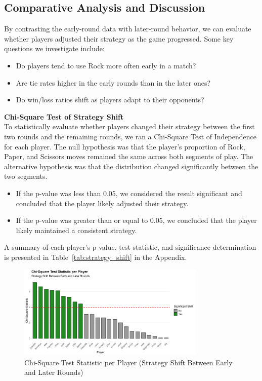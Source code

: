 \documentclass[12pt]{article}
\begin{document}
\subsection*{Comparative Analysis and Discussion}
By contrasting the early-round data with later-round behavior, we can evaluate whether players adjusted their strategy as the game progressed. Some key questions we investigate include:

\begin{itemize}
    \item Do players tend to use Rock more often early in a match?
    \item Are tie rates higher in the early rounds than in the later ones?
    \item Do win/loss ratios shift as players adapt to their opponents?
\end{itemize}

\vspace{1em}

\noindent\textbf{Chi-Square Test of Strategy Shift}\\
To statistically evaluate whether players changed their strategy between the first two rounds and the remaining rounds, we ran a Chi-Square Test of Independence for each player. The null hypothesis was that the player’s proportion of Rock, Paper, and Scissors moves remained the same across both segments of play. The alternative hypothesis was that the distribution changed significantly between the two segments.

\begin{itemize}
    \item If the p-value was less than 0.05, we considered the result significant and concluded that the player likely adjusted their strategy.
    \item If the p-value was greater than or equal to 0.05, we concluded that the player likely maintained a consistent strategy.
\end{itemize}

\noindent A summary of each player’s p-value, test statistic, and significance determination is presented in Table~\ref{tab:strategy_shift} in the Appendix.

\vspace{1em}
\begin{figure}[H]
\centering
\includegraphics[width=0.8\textwidth]{figures/strategy_shift_chisq.png}
\caption{Chi-Square Test Statistic per Player (Strategy Shift Between Early and Later Rounds)}
\label{fig:strategy_shift_bar}
\end{figure}
\end{document}
